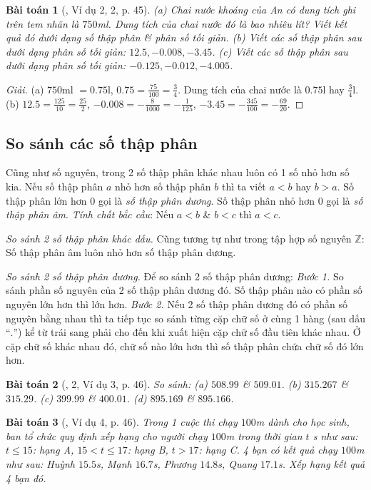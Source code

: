 \documentclass{article}
\newtheorem{baitoan}{Bài toán}
\begin{document}
\begin{baitoan}[\cite{SGK_Toan_6_Canh_Dieu_tap_2}, Ví dụ 2, 2, p. 45]
	(a) Chai nước khoáng của An có dung tích ghi trên tem nhãn là $750$\emph{ml}. Dung tích của chai nước đó là bao nhiêu lít? Viết kết quả đó dưới dạng số thập phân \& phân số tối giản. (b) Viết các số thập phân sau dưới dạng phân số tối giản: $12.5,-0.008,-3.45$. (c) Viết các số thập phân sau dưới dạng phân số tối giản: $-0.125,-0.012,-4.005$.
\end{baitoan}

\begin{proof}[Giải]
	(a) $750$ml $= 0.75$l, $0.75 = \frac{75}{100} = \frac{3}{4}$. Dung tích của chai nước là $0.75$l hay $\frac{3}{4}$l. (b) $12.5 = \frac{125}{10} = \frac{25}{2}$, $-0.008 = -\frac{8}{1000} = -\frac{1}{125}$, $-3.45 = -\frac{345}{100} = -\frac{69}{20}$.
\end{proof}

\subsection{So sánh các số thập phân}
Cũng như số nguyên, trong 2 số thập phân khác nhau luôn có 1 số nhỏ hơn số kia. Nếu số thập phân $a$ nhỏ hơn số thập phân $b$ thì ta viết $a < b$ hay $b > a$. Số thập phân lớn hơn $0$ gọi là \textit{số thập phân dương}. Số thập phân nhỏ hơn $0$ gọi là \textit{số thập phân âm}. \textit{Tính chất bắc cầu}: Nếu $a < b$ \& $b < c$ thì $a < c$.

\textit{So sánh 2 số thập phân khác dấu.} Cũng tương tự như trong tập hợp số nguyên $\mathbb{Z}$: Số thập phân âm luôn nhỏ hơn số thập phân dương.

\textit{So sánh 2 số thập phân dương.} Để so sánh 2 số thập phân dương: \textit{Bước 1.} So sánh phần số nguyên của 2 số thập phân dương đó. Số thập phân nào có phần số nguyên lớn hơn thì lớn hơn. \textit{Bước 2.} Nếu 2 số thập phân dương đó có phần số nguyên bằng nhau thì ta tiếp tục so sánh từng cặp chữ số ở cùng 1 hàng (sau dấu ``$.$'') kể từ trái sang phải cho đến khi xuất hiện cặp chữ số đầu tiên khác nhau. Ở cặp chữ số khác nhau đó, chữ số nào lớn hơn thì số thập phân chứa chữ số đó lớn hơn.

\begin{baitoan}[\cite{SGK_Toan_6_Canh_Dieu_tap_2}, 2, Ví dụ 3, p. 46]
	So sánh: (a) $508.99$ \& $509.01$. (b) $315.267$ \& $315.29$. (c) $399.99$ \& $400.01$. (d) $895.169$ \& $895.166$.
\end{baitoan}

\begin{baitoan}[\cite{SGK_Toan_6_Canh_Dieu_tap_2}, Ví dụ 4, p. 46]
	Trong 1 cuộc thi chạy $100$\emph{m} dành cho học sinh, ban tổ chức quy định xếp hạng cho người chạy $100$\emph{m} trong thời gian $t$ \emph{s} như sau: $t\le15$: hạng A, $15 < t\le17$: hạng B, $t > 17$: hạng C. 4 bạn có kết quả chạy $100$\emph{m} như sau: Huỳnh $15.5$\emph{s}, Mạnh $16.7$\emph{s}, Phương $14.8$\emph{s}, Quang $17.1$\emph{s}. Xếp hạng kết quả 4 bạn đó.
\end{baitoan}
\end{document}
